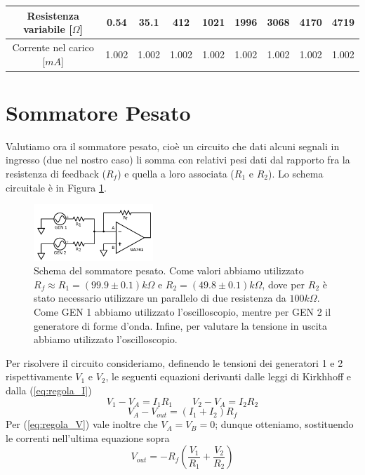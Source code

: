 \begin{center}
\begin{tabular}{c|c|c|c|c|c|c|c|c}
Resistenza variabile [$\Omega$] & 0.54 & 35.1 & 412 & 1021 & 1996 & 3068 & 4170 & 4719 \\ 
\hline 
Corrente nel carico [$mA$] & 1.002 & 1.002 & 1.002 & 1.002 & 1.002 & 1.002 & 1.002 & 1.002 \\ 
\end{tabular}
\end{center}

\section{Sommatore Pesato}

Valutiamo ora il sommatore pesato, cioè un circuito che dati alcuni segnali in ingresso (due nel nostro caso) li somma con relativi pesi dati dal rapporto fra la resistenza di feedback ($R_f$) e quella a loro associata ($R_1$ e $R_2$). Lo schema circuitale è in Figura \ref{sommatore_pesato}.

\begin{figure}
  \begin{center}
    \includegraphics[width=0.40\textwidth]{../E01/latex/c2.pdf}
  \end{center}
  \caption{Schema del sommatore pesato. Come valori abbiamo utilizzato $R_f \approx R_1=(99.9 \pm 0.1) k \Omega$ e $R_2=(49.8 \pm 0.1) k \Omega$, dove per $R_2$ è stato necessario utilizzare un parallelo di due resistenza da $100 k\Omega$. Come GEN 1 abbiamo utilizzato l'oscilloscopio, mentre per GEN 2 il generatore di forme d'onda. Infine, per valutare la tensione in uscita abbiamo utilizzato l'oscilloscopio.}
  \label{sommatore_pesato}
\end{figure}

Per risolvere il circuito consideriamo, definendo le tensioni dei generatori 1 e 2 rispettivamente $V_1$ e $V_2$, le seguenti equazioni derivanti dalle leggi di Kirkhhoff e dalla (\ref{eq:regola_I})
$$V_1 - V_A =I_1 R_1 \qquad V_2 - V_A =I_2 R_2$$
$$V_A - V_{out} =(I_1+I_2) R_f$$
Per (\ref{eq:regola_V}) vale inoltre che $V_A=V_B=0$; dunque otteniamo, sostituendo le correnti nell'ultima equazione sopra
$$V_{out}=-R_f \left( \frac{V_1}{R_1}+\frac{V_2}{R_2}\right)$$

